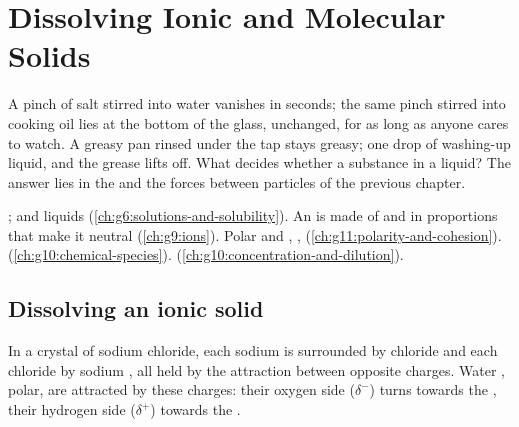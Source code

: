 \chapter{Dissolving Ionic and Molecular Solids}\label{ch:g11:dissolution}

A pinch of salt stirred into water vanishes in seconds; the same pinch
stirred into cooking oil lies at the bottom of the glass, unchanged, for
as long as anyone cares to watch. A greasy pan rinsed under the tap stays
greasy; one drop of washing-up liquid, and the grease lifts off. What
decides whether a substance  in a liquid? The answer lies in
the  and the forces between particles of the previous
chapter.

\begin{recall}
;  and  liquids
(\cref{ch:g6:solutions-and-solubility}). An  is made of
 and  in proportions that make it neutral
(\cref{ch:g9:ions}). Polar and , ,
 (\cref{ch:g11:polarity-and-cohesion}).
 (\cref{ch:g10:chemical-species}).  (\cref{ch:g10:concentration-and-dilution}).
\end{recall}

\section{Dissolving an ionic solid}

In a crystal of sodium chloride, each sodium   is surrounded
by chloride   and each chloride  by sodium , all held
by the attraction between opposite charges. Water , polar, are
attracted by these charges: their oxygen side ($\delta^-$) turns towards
the , their hydrogen side ($\delta^+$) towards the .

